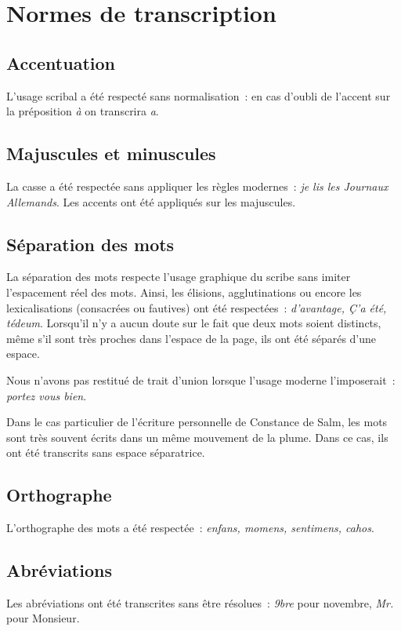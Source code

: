 \documentclass[a4paper,12pt,twoside]{book}
\begin{document}
	\appendixpage %
	\chapter{Normes de transcription}
	
		\section{Accentuation}
			L'usage scribal a été respecté sans normalisation~: en cas d'oubli de l'accent sur la préposition \textit{à} on transcrira \textit{a}.
		
		\section{Majuscules et minuscules}
			La casse a été respectée sans appliquer les règles modernes~: \textit{je lis les Journaux Allemands}. Les accents ont été appliqués sur les majuscules.
		
		\section{Séparation des mots}
			La séparation des mots respecte l'usage graphique du scribe sans imiter l'espacement réel des mots. Ainsi, les élisions, agglutinations ou encore les lexicalisations (consacrées ou fautives) ont été respectées~: \textit{d'avantage, Ç'a été, tédeum}. Lorsqu'il n'y a aucun doute sur le fait que deux mots soient distincts, même s'il sont très proches dans l'espace de la page, ils ont été séparés d'une espace.
		
			Nous n'avons pas restitué de trait d'union lorsque l'usage moderne l'imposerait~: \textit{portez vous bien}.
	
			Dans le cas particulier de l'écriture personnelle de Constance de Salm, les mots sont très souvent écrits dans un même mouvement de la plume. Dans ce cas, ils ont été transcrits sans espace séparatrice.
				
		\section{Orthographe}
			L'orthographe des mots a été respectée~: \textit{enfans, momens, sentimens, cahos}.
		
		\section{Abréviations}
			Les abréviations ont été transcrites sans être résolues~: \textit{9bre} pour novembre, \textit{Mr.} pour Monsieur.
		
\end{document}
